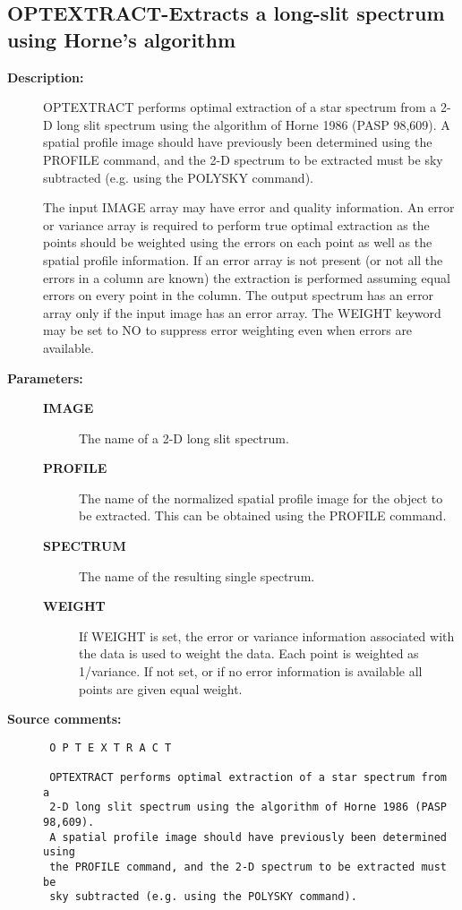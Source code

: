 \subsection{OPTEXTRACT-\label{OPTEXTRACT}Extracts a long-slit spectrum using Horne's algorithm}
\begin{description}

\item [{\bf Description:}]
 OPTEXTRACT performs optimal extraction of a star spectrum from a
 2-D long slit spectrum using the algorithm of Horne 1986 (PASP
 98,609).  A spatial profile image should have previously been
 determined using the PROFILE command, and the 2-D spectrum to be
 extracted must be sky subtracted (e.g. using the POLYSKY command).

 The input IMAGE array may have error and quality information.
 An error or variance array is required to perform true optimal
 extraction as the points should be weighted using the errors on
 each point as well as the spatial profile information. If an error
 array is not present (or not all the errors in a column are known)
 the extraction is performed assuming equal errors on every point
 in the column. The output spectrum has an error array only if the
 input image has an error array. The WEIGHT keyword may be set to NO
 to suppress error weighting even when errors are available.

\item [{\bf Parameters:}]
\begin{description}
\item [{\bf IMAGE}]
 The name of a 2-D long slit spectrum.
\item [{\bf PROFILE}]
 The name of the normalized spatial profile image for
 the object to be extracted. This can be obtained
 using the PROFILE command.
\item [{\bf SPECTRUM}]
 The name of the resulting single spectrum.
\item [{\bf WEIGHT}]
 If WEIGHT is set, the error or variance information
 associated with the data is used to weight the data.
 Each point is weighted as 1/variance. If not set, or
 if no error information is available all points are
 given equal weight.
\end{description}

\item [{\bf Source comments:}]
\begin{verbatim}
 O P T E X T R A C T

 OPTEXTRACT performs optimal extraction of a star spectrum from a
 2-D long slit spectrum using the algorithm of Horne 1986 (PASP 98,609).
 A spatial profile image should have previously been determined using
 the PROFILE command, and the 2-D spectrum to be extracted must be
 sky subtracted (e.g. using the POLYSKY command).


\end{verbatim}
\end{description}

